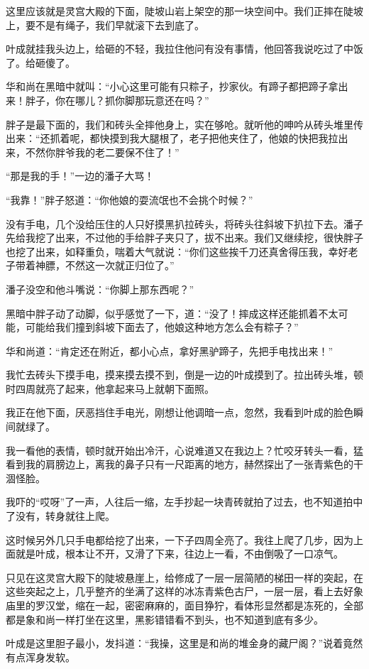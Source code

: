 这里应该就是灵宫大殿的下面，陡坡山岩上架空的那一块空间中。我们正摔在陡坡上，要不是有绳子，我们早就滚下去到底了。

叶成就挂我头边上，给砸的不轻，我拉住他问有没有事情，他回答我说吃过了中饭了。给砸傻了。

华和尚在黑暗中就叫：“小心这里可能有只粽子，抄家伙。有蹄子都把蹄子拿出来！胖子，你在哪儿？抓你脚那玩意还在吗？”

胖子是最下面的，我们和砖头全摔他身上，实在够呛。就听他的呻吟从砖头堆里传出来：“还抓着呢，都快摸到我大腿根了，老子把他夹住了，他娘的快把我拉出来，不然你胖爷我的老二要保不住了！”

“那是我的手！”一边的潘子大骂！

“我靠！”胖子怒道：“你他娘的耍流氓也不会挑个时候？”

没有手电，几个没给压住的人只好摸黑扒拉砖头，将砖头往斜坡下扒拉下去。潘子先给我挖了出来，不过他的手给胖子夹只了，拔不出来。我们又继续挖，很快胖子也挖了出来，如释重负，喘着大气就说：“你们这些挨千刀还真舍得压我，幸好老子带着神膘，不然这一次就正归位了。”

潘子没空和他斗嘴说：“你脚上那东西呢？”

黑暗中胖子动了动脚，似乎感觉了一下，道：“没了！摔成这样还能抓着不太可能，可能给我们撞到斜坡下面去了，他娘这种地方怎么会有粽子？”

华和尚道：“肯定还在附近，都小心点，拿好黑驴蹄子，先把手电找出来！”

我忙去砖头下摸手电，摸来摸去摸不到，倒是一边的叶成摸到了。拉出砖头堆，顿时四周就亮了起来，他拿起来马上就朝下面照。

我正在他下面，厌恶挡住手电光，刚想让他调暗一点，忽然，我看到叶成的脸色瞬间就绿了。

我一看他的表情，顿时就开始出冷汗，心说难道又在我边上？忙咬牙转头一看，猛看到我的肩膀边上，离我的鼻子只有一尺距离的地方，赫然探出了一张青紫色的干涸怪脸。

我吓的“哎呀”了一声，人往后一缩，左手抄起一块青砖就拍了过去，也不知道拍中了没有，转身就往上爬。

这时候另外几只手电都给挖了出来，一下子四周全亮了。我往上爬了几步，因为上面就是叶成，根本让不开，又滑了下来，往边上一看，不由倒吸了一口凉气。

只见在这灵宫大殿下的陡坡悬崖上，给修成了一层一层简陋的梯田一样的突起，在这些突起之上，几乎整齐的坐满了这样的冰冻青紫色古尸，一层一层，看上去好象庙里的罗汉堂，缩在一起，密密麻麻的，面目狰狞，看体形显然都是冻死的，全部都是象和尚一样打坐在这里，黑影错错看不到头，也不知道到底有多少。

叶成是这里胆子最小，发抖道：“我操，这里是和尚的堆金身的藏尸阁？”说着竟然有点浑身发软。

